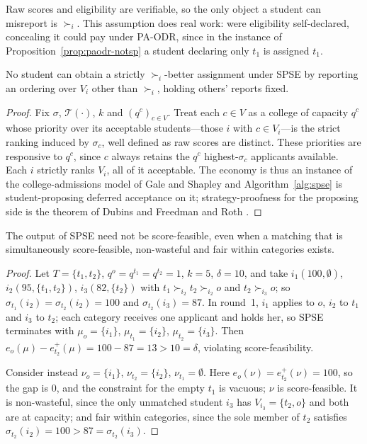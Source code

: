 \documentclass[runningheads]{llncs}
\newcommand{\T}{\mathcal{T}}
\begin{document}
Raw scores and eligibility are verifiable, so the only object a student can misreport is $\succ_i$. This assumption does real work: were eligibility self-declared, concealing it could pay under PA-ODR, since in the instance of Proposition~\ref{prop:paodr-notsp} a student declaring only $t_1$ is assigned $t_1$.

\begin{proposition}
\label{prop:spse-sp}
No student can obtain a strictly $\succ_i$-better assignment under SPSE by reporting an ordering over $V_i$ other than $\succ_i$, holding others' reports fixed.
\end{proposition}

\begin{proof}
Fix $\sigma$, $\T(\cdot)$, $k$ and $(q^c)_{c\in V}$. Treat each $c\in V$ as a college of capacity $q^c$ whose priority over its acceptable students---those $i$ with $c\in V_i$---is the strict ranking induced by $\sigma_c$, well defined as raw scores are distinct. These priorities are responsive to $q^c$, since $c$ always retains the $q^c$ highest-$\sigma_c$ applicants available. Each $i$ strictly ranks $V_i$, all of it acceptable. The economy is thus an instance of the college-admissions model of Gale and Shapley \cite{GaSh62a} and Algorithm~\ref{alg:spse} is student-proposing deferred acceptance on it; strategy-proofness for the proposing side is the theorem of Dubins and Freedman \cite{DuFr81a} and Roth \cite{Roth82a}.
\end{proof}

\begin{proposition}
\label{prop:spse-not-sf}
The output of SPSE need not be score-feasible, even when a matching that is simultaneously score-feasible, non-wasteful and fair within categories exists.
\end{proposition}

\begin{proof}
Let $T=\{t_1,t_2\}$, $q^o=q^{t_1}=q^{t_2}=1$, $k=5$, $\delta=10$, and take $i_1(100,\emptyset)$, $i_2(95,\{t_1,t_2\})$, $i_3(82,\{t_2\})$ with $t_1\succ_{i_2}t_2\succ_{i_2}o$ and $t_2\succ_{i_3}o$; so $\sigma_{t_1}(i_2)=\sigma_{t_2}(i_2)=100$ and $\sigma_{t_2}(i_3)=87$. In round~1, $i_1$ applies to $o$, $i_2$ to $t_1$ and $i_3$ to $t_2$; each category receives one applicant and holds her, so SPSE terminates with $\mu_o=\{i_1\}$, $\mu_{t_1}=\{i_2\}$, $\mu_{t_2}=\{i_3\}$. Then $e_o(\mu)-e_{t_2}^+(\mu)=100-87=13>10=\delta$, violating score-feasibility.

Consider instead $\nu_o=\{i_1\}$, $\nu_{t_2}=\{i_2\}$, $\nu_{t_1}=\emptyset$. Here $e_o(\nu)=e_{t_2}^+(\nu)=100$, so the gap is $0$, and the constraint for the empty $t_1$ is vacuous; $\nu$ is score-feasible. It is non-wasteful, since the only unmatched student $i_3$ has $V_{i_3}=\{t_2,o\}$ and both are at capacity; and fair within categories, since the sole member of $t_2$ satisfies $\sigma_{t_2}(i_2)=100>87=\sigma_{t_2}(i_3)$.
\end{proof}
\end{document}
